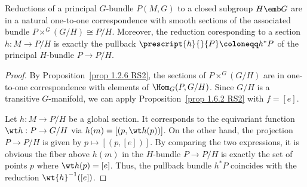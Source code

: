 \begin{cor}[{{\cite[Cor.~1.6.5]{RS2}}}]\label{cor 1.6.5 RS2}
    Reductions of a principal $G$-bundle $P(M,G)$ to a closed subgroup $H\emb G$ are in a natural one-to-one correspondence with smooth sections of the associated bundle $P\times^G (G\slash H)\cong P\slash H$. Moreover, the reduction coresponding to a section $h:M\to P\slash H$ is exactly the pullback $\prescript{h}{}{P}\coloneqq h^\ast P$ of the principal $H$-bundle $P\to P\slash H$.
\end{cor}
\begin{proof}
    By Proposition~\ref{prop 1.2.6 RS2}, the sections of $P\times^G (G\slash H)$ are in one-to-one correspondence with elements of $\Hom_G(P,G\slash H)$. Since $G\slash H$ is a transitive $G$-manifold, we can apply Proposition~\ref{prop 1.6.2 RS2} with $f=[e]$.

    Let $h:M\to P\slash H$ be a global section. It corresponds to the equivariant function $\wt h:P\to G\slash H$ via $h(m)=[(p,\wt h(p))]$. On the other hand, the projection $P\to P\slash H$ is given by $p\mapsto [(p,[e])]$. By comparing the two expressions, it is obvious the fiber above $h(m)$ in the $H$-bundle $P\to P\slash H$ is exactly the set of points $p$ where $\wt h(p)=[e]$. Thus, the pullback bundle $h^\ast P$ coincides with the reduction $\wt{h}^{-1}([e])$.
\end{proof}

